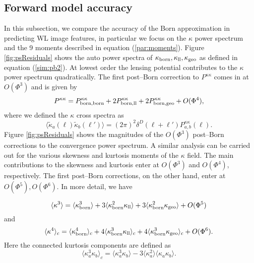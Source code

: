 \documentclass[reprint,aps,prd,superscriptaddress,showkeys,showpacs]{revtex4-1}
\begin{document}
\subsection{Forward model accuracy}

In this subsection, we compare the accuracy of the Born approximation in predicting WL image features, in particular we focus on the $\kappa$ power spectrum and the 9 moments described in equation (\ref{par:moments}). Figure \ref{fig:psResiduals} shows the auto power spectra of $\kappa_{\rm born},\kappa_{\rm ll},\kappa_{\rm geo}$ as defined in equation (\ref{sim:pb2}). At lowest order the lensing potential contributes to the $\kappa$ power spectrum quadratically. The first post--Born correction to $P^{\kappa\kappa}$ comes in at $O(\Phi^3)$ and is given by
\begin{equation}
\label{res:powercorr}
P^{\kappa\kappa} = P^{\kappa\kappa}_{\rm born,born} + 2P^{\kappa\kappa}_{\rm born,ll} + 2P^{\kappa\kappa}_{\rm born,geo} + O(\Phi^4),
\end{equation}
%
where we defined the $\kappa$ cross spectra as
\begin{equation}
\label{res:powercross}
\langle\tilde{\kappa}_a(\pmb{\ell})\tilde{\kappa}_b(\pmb{\ell}')\rangle = (2\pi)^2\delta^D(\pmb{\ell}+\pmb{\ell}')P_{a,b}^{\kappa\kappa}(\ell).
\end{equation} 
%
Figure \ref{fig:psResiduals} shows the magnitudes of the $O(\Phi^3)$ post--Born corrections to the convergence power spectrum. A similar analysis can be carried out for the various skewness and kurtosis moments of the $\kappa$ field. The main contributions to the skewness and kurtosis enter at $O(\Phi^3)$ and $O(\Phi^4)$, respectively. The first post--Born corrections, on the other hand, enter at $O(\Phi^5),O(\Phi^6)$. In more detail, we have

\begin{equation}
\label{res:skewcross}
\langle\kappa^3\rangle = \langle\kappa_{\rm born}^3\rangle + 3\langle\kappa_{\rm born}^2\kappa_{\rm ll}\rangle + 3\langle\kappa_{\rm born}^2\kappa_{\rm geo}\rangle + O(\Phi^5)
\end{equation}
and
\begin{equation}
\label{res:kurtcross}
\langle\kappa^4\rangle_c = \langle\kappa_{\rm born}^4\rangle_c + 4\langle\kappa_{\rm born}^3\kappa_{\rm ll}\rangle_c + 4\langle\kappa_{\rm born}^3\kappa_{\rm geo}\rangle_c + O(\Phi^6).
\end{equation}
%
Here the connected kurtosis components are defined as 
\begin{equation}
\label{res:kurtconnected}
\langle\kappa^3_a\kappa_b\rangle_c = \langle\kappa^3_a\kappa_b\rangle - 3\langle\kappa_a^2\rangle\langle\kappa_a\kappa_b\rangle.
\end{equation}
\end{document}
